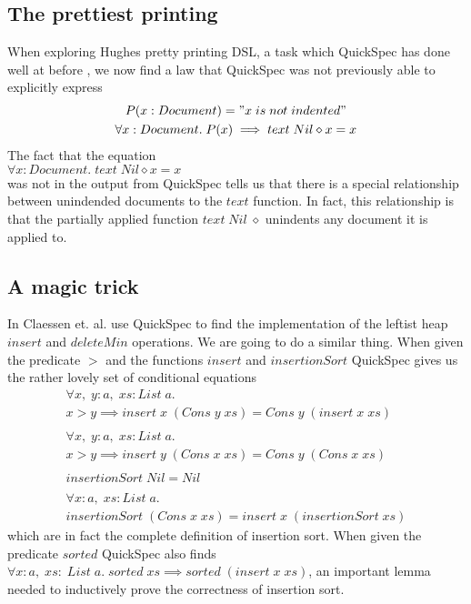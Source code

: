\subsection{The prettiest printing}
    When exploring Hughes pretty printing DSL,\cite{Hughes1995}
    a task which QuickSpec has done well at before%
    , we now find a law that QuickSpec
    was not previously able to explicitly express
    \begin{gather*}
        P(x:Document) = "x\; is\; not\; indented"\\
        \forall x:Document.\; P(x)\implies text\;Nil\diamond x=x
    \end{gather*}
    The fact that the equation\\
    $\forall x:Document.\; text\;Nil\diamond x = x$\\
    was not in the output from QuickSpec tells us that there is a special
    relationship between unindended documents to the $text$ function. In fact, this relationship
    is that the partially applied function $text\;Nil\;\diamond$ unindents any document it is applied to. 

\subsection{A magic trick}
    In \cite{Claessen2010} Claessen et. al.
    use QuickSpec to find the implementation of the leftist
    heap $insert$ and $deleteMin$ operations. 
    We are going to do a similar thing. When given the predicate
    $>$ and the functions $insert$ and $insertionSort$ QuickSpec gives us
    the rather lovely set of conditional equations
    \begin{gather*}
        \forall x,\;y:a,\; xs:List\; a.\\
        x > y \implies insert\; x\; (Cons\; y\; xs) = Cons\; y\; (insert\; x\; xs)\\\\
        \forall x,\;y:a,\; xs:List\; a.\\
        x > y \implies insert\; y\; (Cons\; x\; xs) = Cons\; y\; (Cons\; x\; xs)\\\\
        insertionSort\; Nil = Nil\\\\
        \forall x:a,\; xs:List\; a.\\
        insertionSort\; (Cons\; x\; xs) = insert\; x\; (insertionSort\; xs)
    \end{gather*}
    which are in fact the complete definition of insertion sort.
    When given the predicate $sorted$ QuickSpec also finds
    $\forall x:a,\; xs:\;List\;a.\; sorted\; xs \implies sorted\; (insert\; x\; xs)$,
    an important lemma needed to inductively prove the correctness of insertion sort.
